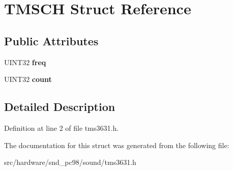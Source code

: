 \hypertarget{structTMSCH}{\section{T\-M\-S\-C\-H Struct Reference}
\label{structTMSCH}
}
\subsection*{Public Attributes}
\begin{DoxyCompactItemize}
\item 
\hypertarget{structTMSCH_af1ac9275e54940f9b307800c92ccd61f}{U\-I\-N\-T32 {\bfseries freq}}\label{structTMSCH_af1ac9275e54940f9b307800c92ccd61f}

\item 
\hypertarget{structTMSCH_ab6b89640b925b808f80329a89fdddd49}{U\-I\-N\-T32 {\bfseries count}}\label{structTMSCH_ab6b89640b925b808f80329a89fdddd49}

\end{DoxyCompactItemize}


\subsection{Detailed Description}


Definition at line 2 of file tms3631.\-h.



The documentation for this struct was generated from the following file\-:\begin{DoxyCompactItemize}
\item 
src/hardware/snd\-\_\-pc98/sound/tms3631.\-h\end{DoxyCompactItemize}
